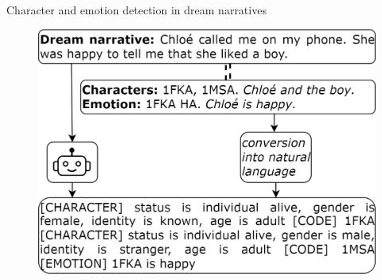 \documentclass[handout,10pt]{beamer}
\begin{document}
\begin{frame}{Character and emotion detection in dream narratives}



\begin{figure}
    \centering
    \includegraphics[width=0.8\linewidth]{img/dream_method.png}
    \label{fig:placeholder}
\end{figure}


    
\end{frame}
\end{document}
